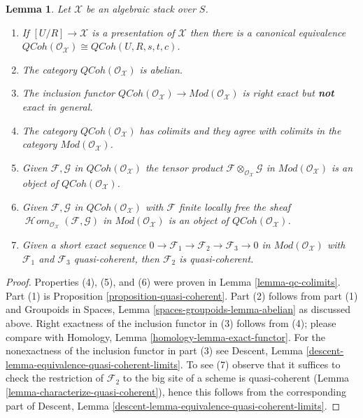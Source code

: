 \documentclass{stacks-project}
\theoremstyle{plain}
\newtheorem{lemma}[subsection]{Lemma}
\theoremstyle{definition}
\theoremstyle{remark}
\numberwithin{equation}{subsection}
\def\SheafHom{\mathop{\mathcal{H}\!\mathit{om}}\nolimits}
\def\QCoh{\mathit{QCoh}}
\begin{document}
\begin{lemma}
\label{lemma-quasi-coherent-algebraic-stack}
Let $\mathcal{X}$ be an algebraic stack over $S$.
\begin{enumerate}
\item If $[U/R] \to \mathcal{X}$ is a presentation of $\mathcal{X}$
then there is a canonical equivalence
$\QCoh(\mathcal{O}_\mathcal{X}) \cong
\QCoh(U, R, s, t, c)$.
\item The category $\QCoh(\mathcal{O}_\mathcal{X})$ is abelian.
\item The inclusion functor $\QCoh(\mathcal{O}_\mathcal{X}) \to
\textit{Mod}(\mathcal{O}_\mathcal{X})$ is right exact but
{\bf not} exact in general.
\item The category $\QCoh(\mathcal{O}_\mathcal{X})$
has colimits and they agree with colimits in the category
$\textit{Mod}(\mathcal{O}_\mathcal{X})$.
\item Given $\mathcal{F}, \mathcal{G}$ in
$\QCoh(\mathcal{O}_\mathcal{X})$
the tensor product $\mathcal{F} \otimes_{\mathcal{O}_\mathcal{X}} \mathcal{G}$
in $\textit{Mod}(\mathcal{O}_\mathcal{X})$
is an object of $\QCoh(\mathcal{O}_\mathcal{X})$.
\item Given $\mathcal{F}, \mathcal{G}$ in
$\QCoh(\mathcal{O}_\mathcal{X})$
with $\mathcal{F}$ finite locally free the sheaf
$\SheafHom_{\mathcal{O}_\mathcal{X}}(\mathcal{F}, \mathcal{G})$
in $\textit{Mod}(\mathcal{O}_\mathcal{X})$
is an object of $\QCoh(\mathcal{O}_\mathcal{X})$.
\item Given a short exact sequence
$0 \to \mathcal{F}_1 \to \mathcal{F}_2 \to \mathcal{F}_3 \to 0$
in $\textit{Mod}(\mathcal{O}_\mathcal{X})$
with $\mathcal{F}_1$ and $\mathcal{F}_3$ quasi-coherent, then
$\mathcal{F}_2$ is quasi-coherent.
\end{enumerate}
\end{lemma}

\begin{proof}
Properties (4), (5), and (6) were proven in
Lemma \ref{lemma-qc-colimits}.
Part (1) is
Proposition \ref{proposition-quasi-coherent}.
Part (2) follows from part (1) and
Groupoids in Spaces, Lemma \ref{spaces-groupoids-lemma-abelian}
as discussed above. Right exactness of the inclusion functor
in (3) follows from (4); please compare with
Homology, Lemma \ref{homology-lemma-exact-functor}.
For the nonexactness of the inclusion functor in part (3) see
Descent, Lemma \ref{descent-lemma-equivalence-quasi-coherent-limits}.
To see (7) observe that it suffices to check the restriction
of $\mathcal{F}_2$ to the big site of a scheme is quasi-coherent
(Lemma \ref{lemma-characterize-quasi-coherent}),
hence this follows from the corresponding part of
Descent, Lemma \ref{descent-lemma-equivalence-quasi-coherent-limits}.
\end{proof}
\end{document}
